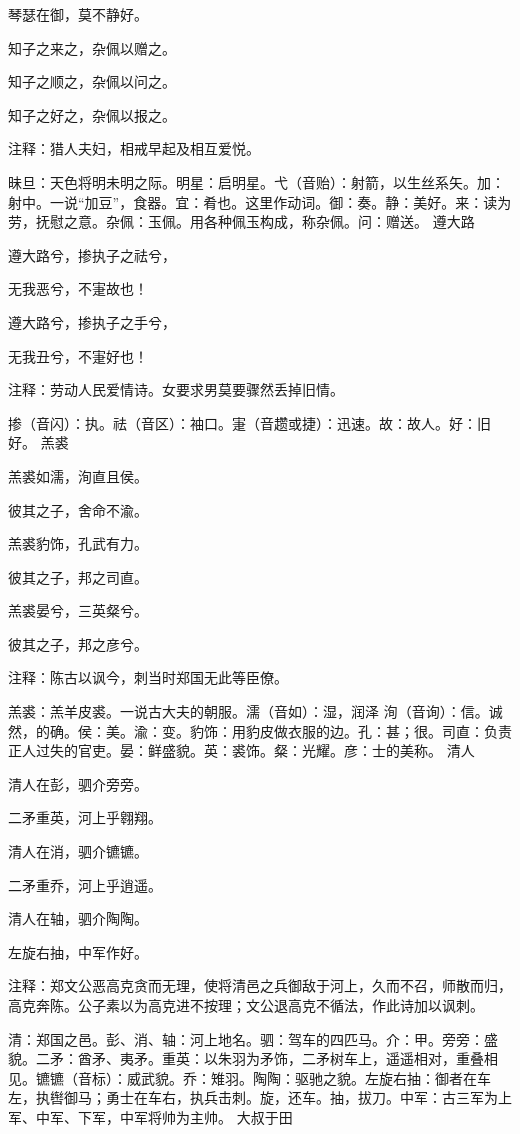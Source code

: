 \documentclass[12pt,UTF8]{ctexbook}
\begin{document}
琴瑟在御，莫不静好。

知子之来之，杂佩以赠之。

知子之顺之，杂佩以问之。

知子之好之，杂佩以报之。

注释：猎人夫妇，相戒早起及相互爱悦。

昧旦：天色将明未明之际。明星：启明星。弋（音贻）：射箭，以生丝系矢。加：射中。一说“加豆”，食器。宜：肴也。这里作动词。御：奏。静：美好。来：读为劳，抚慰之意。杂佩：玉佩。用各种佩玉构成，称杂佩。问：赠送。 遵大路

遵大路兮，掺执子之祛兮，

无我恶兮，不寁故也！

遵大路兮，掺执子之手兮，

无我丑兮，不寁好也！

注释：劳动人民爱情诗。女要求男莫要骤然丢掉旧情。

掺（音闪）：执。祛（音区）：袖口。寁（音趱或捷）：迅速。故：故人。好：旧好。 羔裘

羔裘如濡，洵直且侯。

彼其之子，舍命不渝。

羔裘豹饰，孔武有力。

彼其之子，邦之司直。

羔裘晏兮，三英粲兮。

彼其之子，邦之彦兮。

注释：陈古以讽今，刺当时郑国无此等臣僚。

羔裘：羔羊皮裘。一说古大夫的朝服。濡（音如）：湿，润泽 洵（音询）：信。诚然，的确。侯：美。渝：变。豹饰：用豹皮做衣服的边。孔：甚；很。司直：负责正人过失的官吏。晏：鲜盛貌。英：裘饰。粲：光耀。彦：士的美称。 清人

清人在彭，驷介旁旁。

二矛重英，河上乎翱翔。

清人在消，驷介镳镳。

二矛重乔，河上乎逍遥。

清人在轴，驷介陶陶。

左旋右抽，中军作好。

注释：郑文公恶高克贪而无理，使将清邑之兵御敌于河上，久而不召，师散而归，高克奔陈。公子素以为高克进不按理；文公退高克不循法，作此诗加以讽刺。

清：郑国之邑。彭、消、轴：河上地名。驷：驾车的四匹马。介：甲。旁旁：盛貌。二矛：酋矛、夷矛。重英：以朱羽为矛饰，二矛树车上，遥遥相对，重叠相见。镳镳（音标）：威武貌。乔：雉羽。陶陶：驱驰之貌。左旋右抽：御者在车左，执辔御马；勇士在车右，执兵击刺。旋，还车。抽，拔刀。中军：古三军为上军、中军、下军，中军将帅为主帅。 大叔于田
\end{document}
